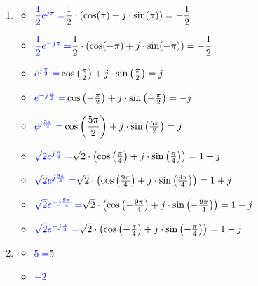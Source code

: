 

\begin{enumerate}[label=\color{red}\textbf{\arabic*)}, leftmargin=*]
	\item {}
	
	\begin{itemize}[label=\color{red}\textbullet, leftmargin=*]
		\item $\textcolor{blue}{\dfrac{1}{2}e^{j\pi}=}\dfrac{1}{2}\cdot\left(\cos(\pi)+j\cdot\sin(\pi)\right)=-\dfrac{1}{2}$
		\item $\textcolor{blue}{\dfrac{1}{2}e^{-j\pi}=}\dfrac{1}{2}\cdot\left(\cos(-\pi)+j\cdot\sin(-\pi)\right)=-\dfrac{1}{2}$
		\item $\textcolor{blue}{e^{j \frac{\pi}{2}}=}\cos \left( \frac{\pi}{2} \right)+j\cdot \sin \left( \frac{\pi}{2} \right)=j$
		\item $\textcolor{blue}{e^{-j \frac{\pi}{2}}=}\cos \left( -\frac{\pi}{2} \right)+j\cdot \sin \left(- \frac{\pi}{2} \right)=-j$
		\item $\textcolor{blue}{e^{j\frac{5\pi}{2}}=}\cos \left( \dfrac{5\pi}{2} \right)+j\cdot \sin \left( \frac{5\pi}{2} \right)=j$
		\item $\textcolor{blue}{\sqrt{ 2 }e^{j\frac{\pi}{4}}=}\sqrt{ 2 }\cdot \left( \cos \left( \frac{\pi}{4}\right)+j\cdot \sin \left( \frac{\pi}{4} \right) \right)=1+j$
		\item $\textcolor{blue}{\sqrt{ 2 }e^{j\frac{9\pi}{4}}=}\sqrt{ 2 }\cdot \left( \cos \left( \frac{9\pi}{4}\right)+j\cdot \sin \left( \frac{9\pi}{4} \right) \right)=1+j$
		\item $\textcolor{blue}{\sqrt{ 2 }e^{-j\frac{9\pi}{4}}=}\sqrt{ 2 }\cdot \left( \cos \left(- \frac{9\pi}{4}\right)+j\cdot \sin \left( -\frac{9\pi}{4} \right) \right)=1-j$
		\item $\textcolor{blue}{\sqrt{ 2 }e^{-j\frac{\pi}{4}}=}\sqrt{ 2 }\cdot \left( \cos \left(- \frac{\pi}{4}\right)+j\cdot \sin \left(- \frac{\pi}{4} \right) \right)=1-j$
	\end{itemize}
	\item {}
	\begin{itemize}[label=\color{red}\textbullet, leftmargin=*]
		\item $\textcolor{blue}{5=}5$
		\item $\textcolor{blue}{-2}$
		

\end{itemize}
\end{enumerate}
